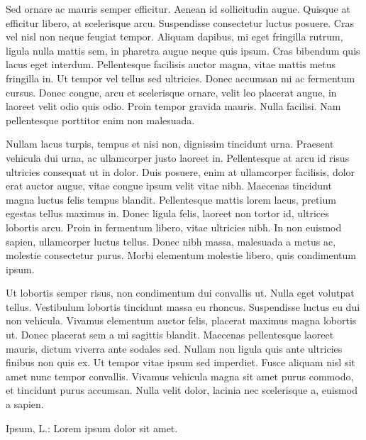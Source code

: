 \documentclass[thesismargins, thesislinespacing, twoside, draft, upjsfrontpage]{rnthesis}
\begin{document}
Sed ornare ac mauris semper efficitur. Aenean id sollicitudin augue. Quisque at efficitur libero, at scelerisque arcu. Suspendisse consectetur luctus posuere. Cras vel nisl non neque feugiat tempor. Aliquam dapibus, mi eget fringilla rutrum, ligula nulla mattis sem, in pharetra augue neque quis ipsum. Cras bibendum quis lacus eget interdum. Pellentesque facilisis auctor magna, vitae mattis metus fringilla in. Ut tempor vel tellus sed ultricies. Donec accumsan mi ac fermentum cursus. Donec congue, arcu et scelerisque ornare, velit leo placerat augue, in laoreet velit odio quis odio. Proin tempor gravida mauris. Nulla facilisi. Nam pellentesque porttitor enim non malesuada.

Nullam lacus turpis, tempus et nisi non, dignissim tincidunt urna. Praesent vehicula dui urna, ac ullamcorper justo laoreet in. Pellentesque at arcu id risus ultricies consequat ut in dolor. Duis posuere, enim at ullamcorper facilisis, dolor erat auctor augue, vitae congue ipsum velit vitae nibh. Maecenas tincidunt magna luctus felis tempus blandit. Pellentesque mattis lorem lacus, pretium egestas tellus maximus in. Donec ligula felis, laoreet non tortor id, ultrices lobortis arcu. Proin in fermentum libero, vitae ultricies nibh. In non euismod sapien, ullamcorper luctus tellus. Donec nibh massa, malesuada a metus ac, molestie consectetur purus. Morbi elementum molestie libero, quis condimentum ipsum.

Ut lobortis semper risus, non condimentum dui convallis ut. Nulla eget volutpat tellus. Vestibulum lobortis tincidunt massa eu rhoncus. Suspendisse luctus eu dui non vehicula. Vivamus elementum auctor felis, placerat maximus magna lobortis ut. Donec placerat sem a mi sagittis blandit. Maecenas pellentesque laoreet mauris, dictum viverra ante sodales sed. Nullam non ligula quis ante ultricies finibus non quis ex. Ut tempor vitae ipsum sed imperdiet. Fusce aliquam nisl sit amet nunc tempor convallis. Vivamus vehicula magna sit amet purus commodo, et tincidunt purus accumsan. Nulla velit dolor, lacinia nec scelerisque a, euismod a sapien. 

%

\begin{thebibliography}{9}
 Ipsum, L.: Lorem ipsum dolor sit amet.
\end{thebibliography}
%
\end{document}
